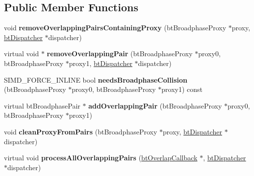 \subsection*{Public Member Functions}
\begin{DoxyCompactItemize}
\item 
\mbox{\label{classbtHashedOverlappingPairCache_a088ca9c8bbd67fe82bb1ac8eb867cecf}} 
void {\bfseries remove\+Overlapping\+Pairs\+Containing\+Proxy} (bt\+Broadphase\+Proxy $\ast$proxy, \hyperlink{classbtDispatcher}{bt\+Dispatcher} $\ast$dispatcher)
\item 
\mbox{\label{classbtHashedOverlappingPairCache_a9f2c753601f361e7ae34755e1938dcda}} 
virtual void $\ast$ {\bfseries remove\+Overlapping\+Pair} (bt\+Broadphase\+Proxy $\ast$proxy0, bt\+Broadphase\+Proxy $\ast$proxy1, \hyperlink{classbtDispatcher}{bt\+Dispatcher} $\ast$dispatcher)
\item 
\mbox{\label{classbtHashedOverlappingPairCache_adc69b96056390f46422651560c2dabfe}} 
S\+I\+M\+D\+\_\+\+F\+O\+R\+C\+E\+\_\+\+I\+N\+L\+I\+NE bool {\bfseries needs\+Broadphase\+Collision} (bt\+Broadphase\+Proxy $\ast$proxy0, bt\+Broadphase\+Proxy $\ast$proxy1) const
\item 
\mbox{\label{classbtHashedOverlappingPairCache_a97935b649a0d10f831340d4f46cb82b6}} 
virtual bt\+Broadphase\+Pair $\ast$ {\bfseries add\+Overlapping\+Pair} (bt\+Broadphase\+Proxy $\ast$proxy0, bt\+Broadphase\+Proxy $\ast$proxy1)
\item 
\mbox{\label{classbtHashedOverlappingPairCache_a14f6d7b7b16b7d032f8a9146c337d211}} 
void {\bfseries clean\+Proxy\+From\+Pairs} (bt\+Broadphase\+Proxy $\ast$proxy, \hyperlink{classbtDispatcher}{bt\+Dispatcher} $\ast$dispatcher)
\item 
\mbox{\label{classbtHashedOverlappingPairCache_ae43638685e775e7de716d8b0ecb615ff}} 
virtual void {\bfseries process\+All\+Overlapping\+Pairs} (\hyperlink{structbtOverlapCallback}{bt\+Overlap\+Callback} $\ast$, \hyperlink{classbtDispatcher}{bt\+Dispatcher} $\ast$dispatcher)
\item 
\mbox{\label{classbtHashedOverlappingPairCache_a9c73398dc9892084bdb17847033f9c94}} 

\end{DoxyCompactItemize}
